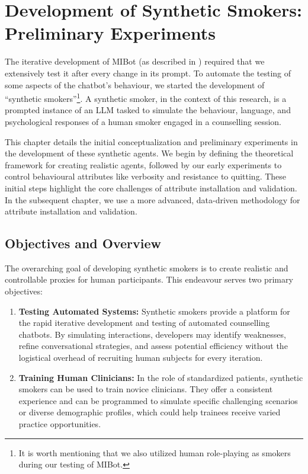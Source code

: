 \chapter{Development of Synthetic Smokers: Preliminary Experiments}
\label{ch:synthetic-smoker-preliminary}

The iterative development of MIBot (as described in ) required that we
extensively test it after every change in its prompt. To automate the testing of some
aspects of the chatbot's behaviour, we started the development of ``synthetic
smokers''\footnote{It is worth mentioning that we also utilized human role-playing as
	smokers during our testing of MIBot.}. A synthetic smoker, in the context of this
research, is a prompted instance of an LLM tasked to simulate the behaviour, language,
and psychological responses of a human smoker engaged in a counselling session.

This chapter details the initial conceptualization and preliminary experiments in the
development of these synthetic agents. We begin by defining the theoretical framework
for creating realistic agents, followed by our early experiments to control behavioural
attributes like verbosity and resistance to quitting. These initial steps highlight the
core challenges of attribute installation and validation. In the subsequent chapter, we
use a more advanced, data-driven methodology for attribute installation and validation.

\section{Objectives and Overview}
\label{sec:synthetic-smoker-goals}

The overarching goal of developing synthetic smokers is to create realistic and
controllable proxies for human participants. This endeavour serves two primary
objectives:

\begin{enumerate}
	\item \textbf{Testing Automated Systems:} Synthetic smokers provide a platform for the rapid iterative development and testing of automated counselling chatbots. By simulating interactions, developers may identify weaknesses, refine conversational strategies, and assess potential efficiency without the logistical overhead of recruiting human subjects for every iteration.
	\item \textbf{Training Human Clinicians:} In the role of standardized patients, synthetic smokers can be used to train novice clinicians. They offer a consistent experience and can be programmed to simulate specific challenging scenarios or diverse demographic profiles, which could help trainees receive varied practice opportunities.
\end{enumerate}

